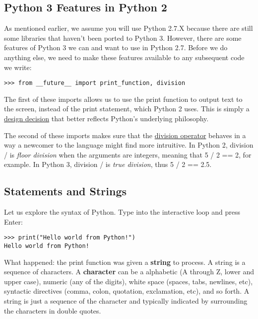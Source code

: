 \subsection{Python 3 Features in Python
2}\label{python-3-features-in-python-2}

As mentioned earlier, we assume you will use Python 2.7.X because there
are still some libraries that haven't been ported to Python 3. However,
there are some features of Python 3 we can and want to use in Python
2.7. Before we do anything else, we need to make these features
available to any subsequent code we write:

\begin{verbatim}
>>> from __future__ import print_function, division
\end{verbatim}

The first of these imports allows us to use the print function to output
text to the screen, instead of the print statement, which Python 2 uses.
This is simply a \href{https://www.python.org/dev/peps/pep-3105/}{design
decision} that better reflects Python's underlying philosophy.

The second of these imports makes sure that the
\href{https://www.python.org/dev/peps/pep-0238/}{division operator}
behaves in a way a newcomer to the language might find more intruitive.
In Python 2, division / is \emph{floor division} when the arguments are
integers, meaning that 5 / 2 == 2, for example. In Python 3, division /
is \emph{true division}, thus 5 / 2 == 2.5.

\subsection{Statements and Strings}\label{statements-and-strings}

Let us explore the syntax of Python. Type into the interactive loop and
press Enter:

\begin{verbatim}
>>> print("Hello world from Python!")
Hello world from Python!
\end{verbatim}

What happened: the print function was given a \textbf{string} to
process. A string is a sequence of characters. A \textbf{character} can
be a alphabetic (A through Z, lower and upper case), numeric (any of the
digits), white space (spaces, tabs, newlines, etc), syntactic directives
(comma, colon, quotation, exclamation, etc), and so forth. A string is
just a sequence of the character and typically indicated by surrounding
the characters in double quotes.

